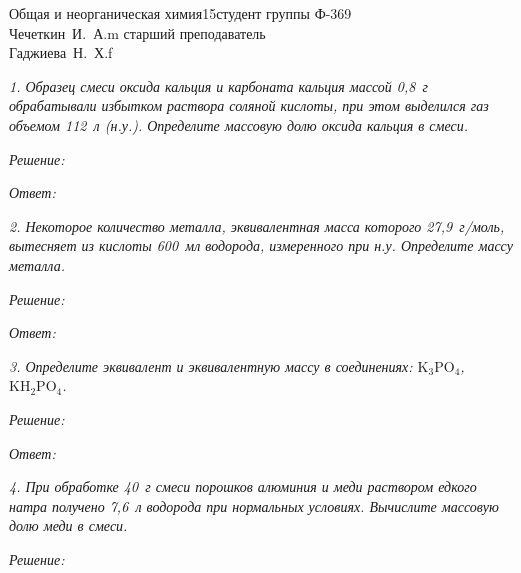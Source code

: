 






{Общая и неорганическая химия}{}{15}{студент группы Ф-369\\Чечеткин~И.~А.}{m}
{старший преподаватель\\Гаджиева~Н.~Х.}{f}


\emph{1. Образец смеси оксида кальция и карбоната кальция массой 0,8~г
обрабатывали избытком раствора соляной кислоты, при этом выделился газ объемом
112~л (н.у.). Определите массовую долю оксида кальция в смеси.}

\vspace*{2em}
\emph{Решение:}

\vspace*{2em}
\emph{Ответ: }

\newpage %

\emph{2. Некоторое количество металла, эквивалентная масса которого
27,9~г/моль, вытесняет из кислоты 600~мл водорода, измеренного при н.у.
Определите массу металла.}

\vspace*{2em}
\emph{Решение:}

\vspace*{2em}
\emph{Ответ: }

\newpage %

\emph{3. Определите эквивалент и эквивалентную массу в соединениях:
\( \mathrm{K_3PO_4} \), \( \mathrm{KH_2PO_4} \).}

\vspace*{2em}
\emph{Решение:}

\vspace*{2em}
\emph{Ответ: }

\newpage %

\emph{4. При обработке 40~г смеси порошков алюминия и меди раствором едкого
натра получено 7,6~л водорода при нормальных условиях. Вычислите массовую долю
меди в смеси.}

\vspace*{2em}
\emph{Решение:}

